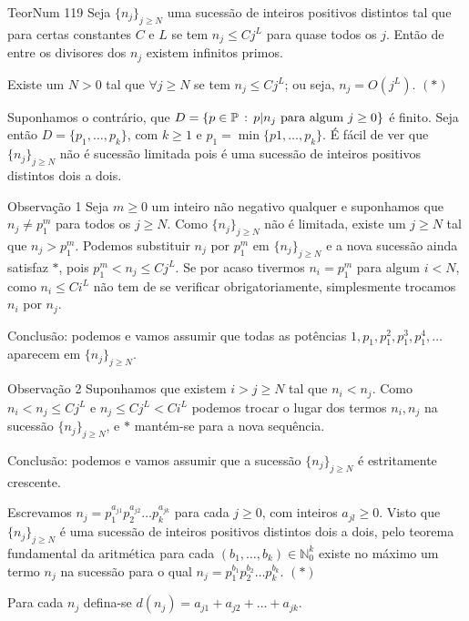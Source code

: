 \documentclass[main.tex]{subfiles}
\newcommand*{\nj}{\ensuremath{\{n_j\}_{j\geq N}}}
\renewcommand*{\=}[1]{\ensuremath{\stackrel{\text{#1}}{=}}}
\begin{document}
\begin{problem}{TeorNum 119}
Seja $\nj$ uma sucessão de inteiros positivos distintos tal que
para certas constantes $C$ e $L$ se tem $n_j\leq Cj^L$ para quase todos os $j$.
Então de entre os divisores dos $n_j$ existem infinitos primos.
\end{problem}

\begin{solution}
Existe um $N>0$ tal que $\forall j\geq N$ se tem $n_j\leq Cj^L$; ou seja,
$n_j=O(j^L)$. $(*)$

Suponhamos o contrário, que
$D=\{p\in\mathbb{P}\,:\, p|n_j\text{ para algum }j\geq 0\}$ é finito.
Seja então $D=\{p_1,\dots,p_k\}$, com $k\geq 1$ e $p_1=\min\{p1,\dots,p_k\}$.
É fácil de ver que $\nj$ não é sucessão limitada pois é uma
sucessão de inteiros positivos distintos dois a dois.

\begin{observation}{Observação 1}
Seja $m\geq 0$ um inteiro não negativo qualquer e suponhamos que $n_j\neq p_1^m$
para todos os $j\geq N$.
Como $\nj$ não é limitada, existe um $j\geq N$ tal que $n_j>p_1^m$.
Podemos substituir $n_j$ por $p_1^m$ em $\nj$ e a nova sucessão ainda satisfaz
$*$, pois $p_1^m<n_j\leq Cj^L$.
Se por acaso tivermos $n_i=p_1^m$ para algum $i<N$, como $n_i\leq Ci^L$
não tem de se verificar obrigatoriamente, simplesmente trocamos $n_i$ por $n_j$.

Conclusão: podemos e vamos assumir que todas as potências
$1,p_1,p_1^2,p_1^3,p_1^4,\dots$ aparecem em $\nj$.
\end{observation}

\begin{observation}{Observação 2}
Suponhamos que existem $i>j\geq N$ tal que $n_i<n_j$.
Como $n_i<n_j\leq Cj^L$ e $n_j\leq Cj^L<Ci^L$ podemos trocar o lugar dos termos
$n_i, n_j$ na sucessão $\nj$, e $*$ mantém-se para a nova sequência.

Conclusão: podemos e vamos assumir que a sucessão $\nj$ é estritamente crescente.
\end{observation}

Escrevamos $n_j=p_1^{a_{j1}}p_2^{a_{j2}}\dots p_k^{a_{jk}}$ para cada $j\geq 0$,
com inteiros $a_{jl}\geq 0$.
Visto que $\nj$ é uma sucessão de inteiros positivos distintos dois a dois,
pelo teorema fundamental da aritmética para cada
$(b_1,\dots,b_k)\in\mathbb{N}_0^k$ existe no máximo um termo $n_j$ na sucessão
para o qual $n_j=p_1^{b_1}p_2^{b_2}\dots p_k^{b_k}$. $(*)$

Para cada $n_j$ defina-se $d(n_j)=a_{j1}+a_{j2}+\dots+a_{jk}$.


\end{solution}
\end{document}
